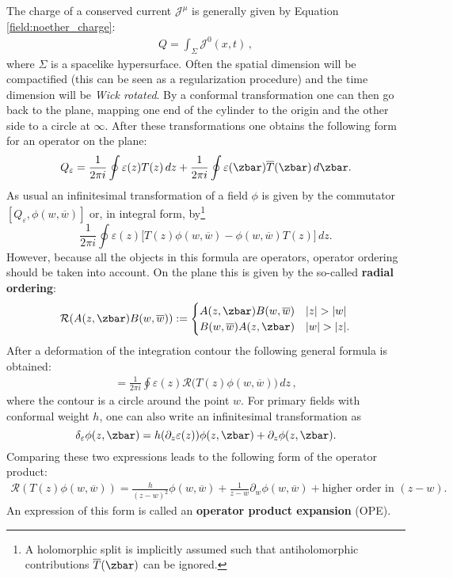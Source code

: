     The charge of a conserved current $\mathcal{J}^\mu$ is generally given by Equation \eqref{field:noether_charge}:
    \begin{gather}
        Q = \int_\Sigma\mathcal{J}^0(x,t)\,,
    \end{gather}
    where $\Sigma$ is a spacelike hypersurface. Often the spatial dimension will be compactified (this can be seen as a regularization procedure) and the time dimension will be \textit{Wick rotated}. By a conformal transformation one can then go back to the plane, mapping one end of the cylinder to the origin and the other side to a circle at $\infty$. After these transformations one obtains the following form for an operator on the plane:
    \begin{gather}
        Q_\varepsilon = \frac{1}{2\pi i}\oint\varepsilon(z)T(z)\,dz + \frac{1}{2\pi i}\oint\varepsilon(\zbar)\overline{T}(\zbar)\,d\zbar.
    \end{gather}
    As usual an infinitesimal transformation of a field $\phi$ is given by the commutator $[Q_\varepsilon,\phi(w,\overline{w})]$ or, in integral form, by\footnote{A holomorphic split is implicitly assumed such that antiholomorphic contributions $\overline{T}(\zbar)$ can be ignored.} \[\frac{1}{2\pi i}\oint\varepsilon(z)\big[T(z)\phi(w,\overline{w}) - \phi(w,\overline{w})T(z)\big]\,dz.\] However, because all the objects in this formula are operators, operator ordering should be taken into account. On the plane this is given by the so-called \textbf{radial ordering}:
    \begin{gather}
        \mathcal{R}(A(z,\zbar)B(w,\overline{w})) :=
        \begin{cases}
            A(z,\zbar)B(w,\overline{w})&|z|>|w|\\
            B(w,\overline{w})A(z,\zbar)&|w|>|z|.
        \end{cases}
    \end{gather}
    After a deformation of the integration contour the following general formula is obtained:
    \begin{gather}
        [Q_\varepsilon,\phi(w,\overline{w})] = \frac{1}{2\pi i}\oint\varepsilon(z)\mathcal{R}\big(T(z)\phi(w,\overline{w})\big)\,dz\,,
    \end{gather}
    where the contour is a circle around the point $w$. For primary fields with conformal weight $h$, one can also write an infinitesimal transformation as \[\delta_\varepsilon\phi(z,\zbar) = h(\partial_z\varepsilon(z))\phi(z,\zbar) + \partial_z\phi(z,\zbar).\] Comparing these two expressions leads to the following form of the operator product:
    \begin{gather}
        \mathcal{R}(T(z)\phi(w,\overline{w})) = \frac{h}{(z-w)^2}\phi(w,\overline{w}) + \frac{1}{z-w}\partial_w\phi(w,\overline{w}) + \text{higher order in } (z-w).
    \end{gather}
    An expression of this form is called an \textbf{operator product expansion} (OPE).

